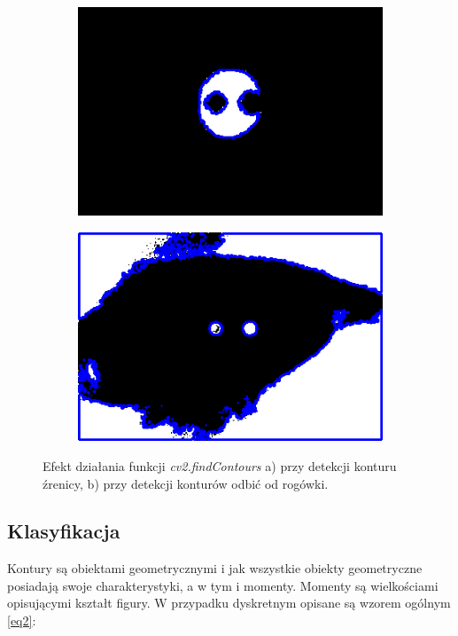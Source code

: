 \begin{figure}[h!]
  \begin{subfigure}[h!]{0.3\textwidth}\subcaption{\label{fig9a}}
    \centering
    \includegraphics[scale=0.48]{images/11.png}
  \end{subfigure}\hspace{2.5cm}
  \begin{subfigure}[h!]{0.3\textwidth}\subcaption{\label{fig9b}}
    \centering
    \includegraphics[scale=0.48]{images/12.png}
  \end{subfigure}
  \caption{Efekt działania funkcji \textit{cv2.findContours} {a)} przy detekcji konturu źrenicy, {b)} przy detekcji konturów odbić od rogówki. \label{fig9}}
\end{figure}

\subsection{Klasyfikacja}

Kontury są obiektami geometrycznymi i jak wszystkie obiekty geometryczne posiadają swoje charakterystyki, a w tym i momenty. Momenty są wielkościami opisującymi kształt figury. W przypadku dyskretnym opisane są wzorem ogólnym \ref{eq2}:

